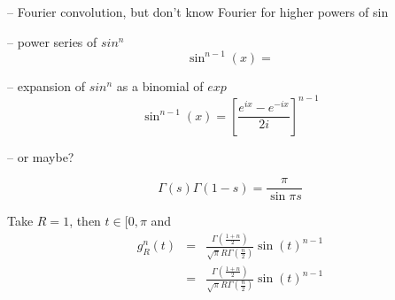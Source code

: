 -- Fourier convolution, but don't know Fourier for higher powers of sin

-- power series of $sin^n$
\begin{equation}
  \label{eq:sin^n_taylor}
  \sin^{n-1}(x) = 
\end{equation}

-- expansion of $sin^n$ as a binomial of $exp$
\begin{equation}
  \label{eq:sin^n_taylor}
  \sin^{n-1}(x) = \left[ \frac{e^{i x} - e^{-i x} }{2 i} \right]^{n-1}
\end{equation}

-- or maybe?

\[ \Gamma(s) \Gamma(1-s) = \frac{\pi}{\sin \pi s} \]


Take $R=1$, then $t \in [0, \pi$ and 
\begin{eqnarray}
g_{R}^{n}(t) & = &   \frac{\Gamma\left(\frac{1+n}{2}\right) }
                         {\sqrt{\pi } R\Gamma\left(\frac{n}{2}\right)}  
                      \sin(t)^{n-1} \nonumber \\
   & = &   \frac{\Gamma\left(\frac{1+n}{2}\right) }
                {\sqrt{\pi } R\Gamma\left(\frac{n}{2}\right)}  
                      \sin(t)^{n-1} \nonumber \\
\end{eqnarray}


